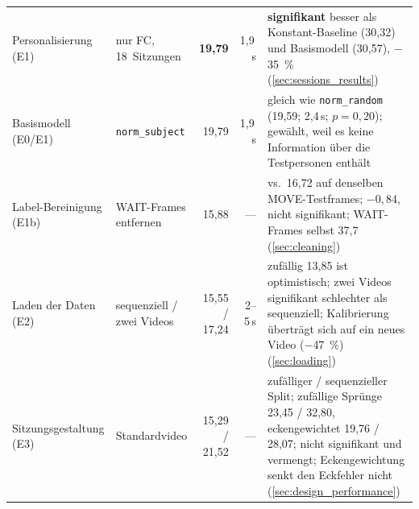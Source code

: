 \documentclass[
  11pt,
  a4paper,
  oneside,
  DIV=12,
  BCOR=8mm,
  parskip=half,
  headings=normal,
  bibliography=totoc,
  listof=totoc
]{scrreprt}
\newcommand{\code}[1]{\texttt{#1}}
\begin{document}
\begin{table}[htbp]
\begin{tabularx}{\textwidth}{>{\raggedright\arraybackslash}p{2.3cm} >{\raggedright\arraybackslash}p{2.2cm} r r Y}
    \midrule
    Personalisierung (E1) & nur FC, 18~Sitzungen & \textbf{19,79} & 1,9\,s & \textbf{signifikant} besser als Konstant-Baseline (30,32) und Basismodell (30,57), $-$\SI{35}{\percent} (\cref{sec:sessions_results}) \\
    Basismodell (E0/E1) & \code{norm\_subject} & 19,79 & 1,9\,s & gleich wie \code{norm\_random} (19,59; 2,4\,s; $p=0,20$); gewählt, weil es keine Information über die Testpersonen enthält \\
    Label-Bereinigung (E1b) & WAIT-Frames entfernen & 15,88 & --- & vs.\ 16,72 auf denselben MOVE-Testframes; $-0,84$, nicht signifikant; WAIT-Frames selbst 37,7 (\cref{sec:cleaning}) \\
    Laden der Daten (E2) & sequenziell / zwei Videos & 15,55 / 17,24 & 2--5\,s & zufällig 13,85 ist optimistisch; zwei Videos signifikant schlechter als sequenziell; Kalibrierung überträgt sich auf ein neues Video ($-$\SI{47}{\percent}) (\cref{sec:loading}) \\
    Sitzungsgestaltung (E3) & Standardvideo & 15,29 / 21,52 & --- & zufälliger / sequenzieller Split; zufällige Sprünge 23,45 / 32,80, eckengewichtet 19,76 / 28,07; nicht signifikant und vermengt; Eckengewichtung senkt den Eckfehler nicht (\cref{sec:design_performance}) \\
    \bottomrule
  \end{tabularx}
\end{table}

\renewcommand{\bibname}{Literaturverzeichnis}


\end{document}
